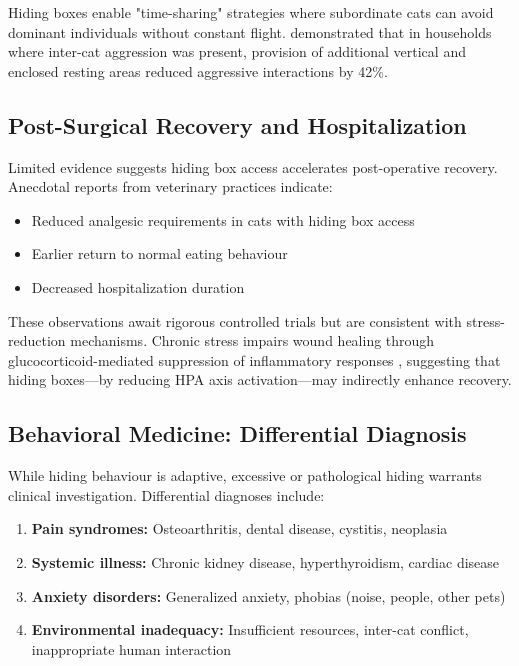 \documentclass[12pt,a4paper]{article}
\begin{document}
Hiding boxes enable "time-sharing" strategies where subordinate cats can avoid dominant individuals without constant flight. \citet{barry2005} demonstrated that in households where inter-cat aggression was present, provision of additional vertical and enclosed resting areas reduced aggressive interactions by 42\%.

\subsection{Post-Surgical Recovery and Hospitalization}

Limited evidence suggests hiding box access accelerates post-operative recovery. Anecdotal reports from veterinary practices indicate:

\begin{itemize}
    \item Reduced analgesic requirements in cats with hiding box access
    \item Earlier return to normal eating behaviour
    \item Decreased hospitalization duration
\end{itemize}

These observations await rigorous controlled trials but are consistent with stress-reduction mechanisms. Chronic stress impairs wound healing through glucocorticoid-mediated suppression of inflammatory responses \citep{marucha1998}, suggesting that hiding boxes—by reducing HPA axis activation—may indirectly enhance recovery.

\subsection{Behavioral Medicine: Differential Diagnosis}

While hiding behaviour is adaptive, excessive or pathological hiding warrants clinical investigation. Differential diagnoses include:

\begin{enumerate}
    \item \textbf{Pain syndromes:} Osteoarthritis, dental disease, cystitis, neoplasia
    \item \textbf{Systemic illness:} Chronic kidney disease, hyperthyroidism, cardiac disease  
    \item \textbf{Anxiety disorders:} Generalized anxiety, phobias (noise, people, other pets)
    \item \textbf{Environmental inadequacy:} Insufficient resources, inter-cat conflict, inappropriate human interaction
\end{enumerate}
\end{document}
